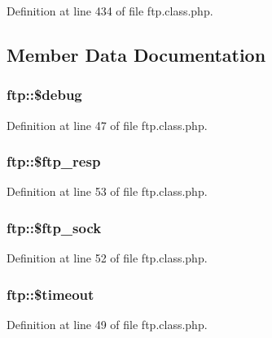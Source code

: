 Definition at line 434 of file ftp.\+class.\+php.



\subsection{Member Data Documentation}
\hypertarget{classftp_a757e4db04d53816db79f117809ffbad2}{
\subsubsection[{\$debug}]{\setlength{\rightskip}{0pt plus 5cm}ftp\+::\$debug}}\label{classftp_a757e4db04d53816db79f117809ffbad2}


Definition at line 47 of file ftp.\+class.\+php.

\hypertarget{classftp_a2bc470fe4d815181c723061b1d2ad824}{
\subsubsection[{\$ftp\+\_\+resp}]{\setlength{\rightskip}{0pt plus 5cm}ftp\+::\$ftp\+\_\+resp}}\label{classftp_a2bc470fe4d815181c723061b1d2ad824}


Definition at line 53 of file ftp.\+class.\+php.

\hypertarget{classftp_a3beffe299e11edfce6ffe4608c2f5dc8}{
\subsubsection[{\$ftp\+\_\+sock}]{\setlength{\rightskip}{0pt plus 5cm}ftp\+::\$ftp\+\_\+sock}}\label{classftp_a3beffe299e11edfce6ffe4608c2f5dc8}


Definition at line 52 of file ftp.\+class.\+php.

\hypertarget{classftp_a219848d21bf555048933e205c270b530}{
\subsubsection[{\$timeout}]{\setlength{\rightskip}{0pt plus 5cm}ftp\+::\$timeout}}\label{classftp_a219848d21bf555048933e205c270b530}


Definition at line 49 of file ftp.\+class.\+php.

